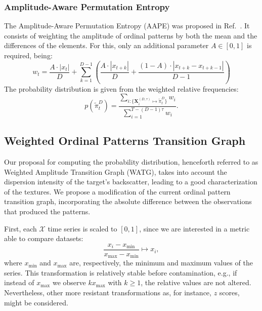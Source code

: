 \documentclass[journal]{IEEEtran}
\begin{document}
	\subsubsection{Amplitude-Aware Permutation Entropy}\label{AAPE}
	
	The Amplitude-Aware Permutation Entropy (AAPE) was proposed in Ref.~\cite{azami2016amplitude}.
	It consists of weighting the amplitude of ordinal patterns by both the mean and the differences of the elements.
	For this, only an additional parameter $ A \in [0, 1]$ is required, being:
	\begin{equation}
	w_t = \frac{A \cdot |x_t|}{D} + \sum_{k = 1}^{D - 1} \left(\frac{A \cdot |x_{t + k}|}{D} + \frac{(1 - A) \cdot |x_{t+k} - x_{t+k-1}|}{D - 1}\right)
	\end{equation}
	The probability distribution is given from the weighted relative frequencies:
	\begin{equation}
	p(\widetilde \pi_t^D) = \frac{\sum_{i : \{\mathbf{X}^{(D,\tau)}_i \mapsto \widetilde\pi^D_t\}} w_{i}}{\sum_{i = 1}^{T-(D-1)\tau} w_{i}}.
	\end{equation}
	
	\subsection{Weighted Ordinal Patterns Transition Graph}\label{WATG}
	
	Our proposal for computing the probability distribution, henceforth referred to as Weighted Amplitude Transition Graph (WATG), takes into account the dispersion intensity of the target's backscatter, leading to a good characterization of the textures.
	We propose a modification of the current ordinal pattern transition graph, incorporating the absolute difference between the observations that produced the patterns.
	
	First, each $\mathcal{X}$ time series is scaled to $[0, 1]$, since we are interested in a metric able to compare datasets:
	\begin{equation}
	\frac{x_i - x_{\min}}{x_{\max} - x_{\min}} \longmapsto x_i,
	\end{equation}
	where $x_{\min}$ and $x_{\max}$ are, respectively, the minimum and maximum values of the series.
	This transformation is relatively stable before contamination, e.g., if instead of $x_{\max}$ we observe $k x_{\max}$ with $k\geq 1$, the relative values are not altered. Nevertheless, other more resistant transformations as, for instance, $z$ scores, might be considered.
	
\end{document}
